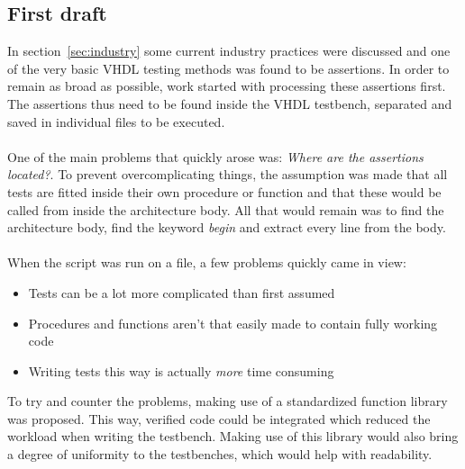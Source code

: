\documentclass[11pt,british]{article}
\begin{document}
\subsection{First draft}
\label{subsec:first}
In section~\ref{sec:industry} some current industry practices were discussed and one of the very basic VHDL testing methods was found to be assertions. In order to remain as broad as possible, work started with processing these assertions first. The assertions thus need to be found inside the VHDL testbench, separated and saved in individual files to be executed.\\
\\
One of the main problems that quickly arose was: \emph{Where are the assertions located?}. To prevent overcomplicating things, the assumption was made that all tests are fitted inside their own procedure or function and that these would be called from inside the architecture body. All that would remain was to find the architecture body, find the keyword \emph{begin} and extract every line from the body.\\
\\
When the script was run on a file, a few problems quickly came in view:
\begin{itemize}
\item Tests can be a lot more complicated than first assumed
\item Procedures and functions aren't that easily made to contain fully working code
\item Writing tests this way is actually \emph{more} time consuming
\end{itemize}
To try and counter the problems, making use of a standardized function library was proposed. This way, verified code could be integrated which reduced the workload when writing the testbench. Making use of this library would also bring a degree of uniformity to the testbenches, which would help with readability.

\newpage{}
\end{document}
